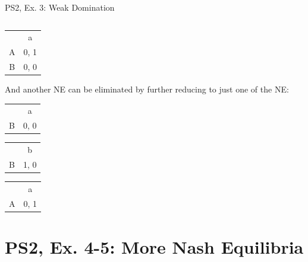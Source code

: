 \begin{frame}{PS2, Ex. 3: Weak Domination}
\begin{multicols}{2}
\begin{table}
\begin{subtable}{.5\columnwidth}
\begin{tabular}{c|c|c|}
        \end{tabular}
      \end{subtable}%
      \begin{subtable}{.5\columnwidth}
        \begin{tabular}{c|c|}
            \multicolumn{1}{c}{} & \multicolumn{1}{c}{a} \\\cline{2-2}
            A & 0, 1 \\\cline{2-2}
            B & 0, 0 \\\cline{2-2}
        \end{tabular}
      \end{subtable}
    \end{table}
    And another NE can be eliminated by further reducing to just one of the NE:
    \begin{table}
      \begin{subtable}{.33\columnwidth}
        \begin{tabular}{c|c|}
            \multicolumn{1}{c}{} & \multicolumn{1}{c}{a} \\\cline{2-2}
            B & 0, 0 \\\cline{2-2}
        \end{tabular}
      \end{subtable}%
      \begin{subtable}{.33\columnwidth}
        \begin{tabular}{c|c|}
            \multicolumn{1}{c}{} & \multicolumn{1}{c}{b} \\\cline{2-2}
            B & 1, 0 \\\cline{2-2}
        \end{tabular}
      \end{subtable}%
      \begin{subtable}{.33\columnwidth}
        \begin{tabular}{c|c|}
            \multicolumn{1}{c}{} & \multicolumn{1}{c}{a} \\\cline{2-2}
            A & 0, 1 \\\cline{2-2}
        \end{tabular}
      \end{subtable}
    \end{table}
  \vfill\null
\end{multicols}
\end{frame}


\section{PS2, Ex. 4-5: More Nash Equilibria}

